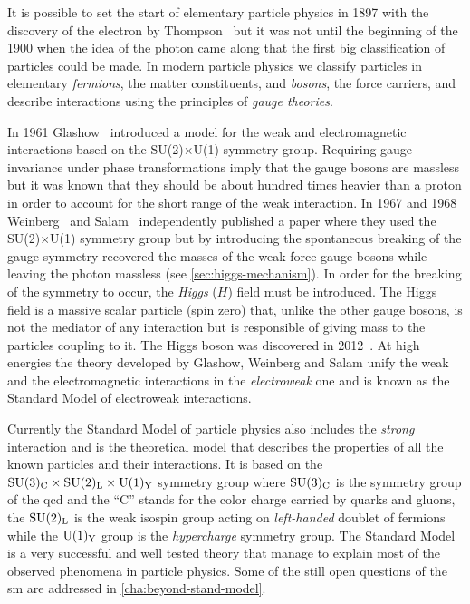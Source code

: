 It is possible to set the start of elementary particle physics in 1897 with the
discovery of the electron by Thompson~\cite{ThompsonBook} but it was not until
the beginning of the 1900 when the idea of the photon came along that the first
big classification of particles could be made. In modern particle physics we
classify particles in elementary \emph{fermions}, the matter constituents, and
\emph{bosons}, the force carriers, and describe interactions using the
principles of \emph{gauge theories}.

In 1961 Glashow~\cite{GlashowPaper} introduced a model for the weak and
electromagnetic interactions based on the SU(2)$\times$U(1) symmetry
group. Requiring gauge invariance under phase transformations imply that the
gauge bosons are massless but it was known that they should be about hundred
times heavier than a proton in order to account for the short range of the weak
interaction. In 1967 and 1968 Weinberg~\cite{WeinbergPaper} and
Salam~\cite{SalamPaper} independently published a paper where they used the
SU(2)$\times$U(1) symmetry group but by introducing the spontaneous breaking of
the gauge symmetry recovered the masses of the weak force gauge bosons while
leaving the photon massless (see \cref{sec:higgs-mechanism}). In order for the
breaking of the symmetry to occur, the \emph{Higgs} ($H$) field must be
introduced. The Higgs field is a massive scalar particle (spin zero) that,
unlike the other gauge bosons, is not the mediator of any interaction but is
responsible of giving mass to the particles coupling to it. The Higgs boson was
discovered in 2012~\cite{ATLASHiggs,CMSHiggs}. At high energies the theory
developed by Glashow, Weinberg and Salam unify the weak and the electromagnetic
interactions in the \emph{electroweak} one and is known as the Standard Model of
electroweak interactions.

Currently the Standard Model of particle physics also includes the \emph{strong}
interaction and is the theoretical model that describes the properties of all
the known particles and their interactions. It is based on the
$\mathrm{SU}(3)_\mathrm{C} \times \mathrm{SU}(2)_\mathrm{L} \times \mathrm{U}(1)_\mathrm{Y}$ symmetry group where $\mathrm{SU}(3)_\mathrm{C}$ is the
symmetry group of the \gls{qcd} and the ``C'' stands for the color charge
carried by quarks and gluons, the $\mathrm{SU}(2)_\mathrm{L}$ is the weak isospin group acting on
\emph{left-handed} doublet of fermions while the $\mathrm{U}(1)_\mathrm{Y}$ group is the
\emph{hypercharge} symmetry group. The Standard Model is a very successful and
well tested theory that manage to explain most of the observed phenomena in
particle physics. Some of the still open questions of the \gls{sm} are addressed
in \cref{cha:beyond-stand-model}.
